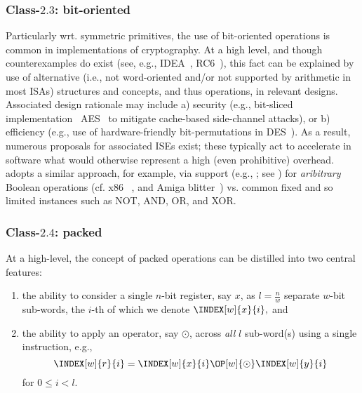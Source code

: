 
\subsubsection{Class-$2.3$: bit-oriented}
\label{sec:bg:feature:2:3}

Particularly wrt. symmetric primitives, the use of bit-oriented operations 
is common in implementations of cryptography.  At a high level, and though 
counterexamples do exist 
(see, e.g., IDEA~\cite{SCARV:LaiMas:90}, RC6~\cite{SCARV:RRSY:98}),
this fact can be explained by use of alternative (i.e., not word-oriented
and/or not supported by arithmetic in most ISAs) structures and concepts,
and thus operations, in relevant designs.  Associated design rationale may
include
a) security
   (e.g., bit-sliced implementation~\cite{SCARV:KasSch:09} AES~\cite{SCARV:FIPS:197} to mitigate cache-based side-channel attacks),
   or
b) efficiency
   (e.g., use of hardware-friendly bit-permutations in DES~\cite{SCARV:FIPS:46_3}).
As a result, numerous proposals for associated ISEs exist; these typically
act to accelerate in software what would otherwise represent a high (even 
prohibitive) overhead.  \XCID adopts a similar approach, for example, via
support
(e.g., ; see )
for {\em aribitrary} Boolean operations
(cf. x86 ~\cite[5-446--5-468]{SCARV:X86:2:18}, and Amiga blitter~\cite[Chapter 6]{SCARV:Amiga:85})
vs. common fixed and so limited instances such as NOT, AND, OR, and XOR.


\subsubsection{Class-$2.4$: packed}
\label{sec:bg:feature:2:4}

At a high-level, the concept of packed operations can be distilled into two 
central features:

\begin{enumerate}
\item the ability to consider a single $n$-bit register, 
      say $x$, 
      as $l = \frac{n}{w}$ separate $w$-bit sub-words, the $i$-th of which
      we denote
      $
      \INDEX[w]{x}{i} ,
      $
      and
\item the ability to apply an operator,
      say $\odot$,
      across {\em all} $l$ sub-word(s) using a single instruction, e.g.,
      \[
      \INDEX[w]{r}{i} = \INDEX[w]{x}{i} \OP[w]{\odot} \INDEX[w]{y}{i}
      \]
      for $0 \leq i < l$.
\end{enumerate}

